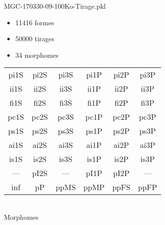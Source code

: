 MGC-170330-09-100Ko-Tirage.pkl
\begin{itemize}
\item 11416 formes
\item 50000 tirages
\item 34 morphomes
\end{itemize}
\begin{center}
\begin{tabular}{cccccc}
\hline
\cellcolor{white}pi1S & \cellcolor{orange}pi2S & \cellcolor{orange}pi3S & \cellcolor{white}pi1P & \cellcolor{white}pi2P & \cellcolor{white}pi3P\\
\cellcolor{brown}ii1S & \cellcolor{brown}ii2S & \cellcolor{brown}ii3S & \cellcolor{white}ii1P & \cellcolor{white}ii2P & \cellcolor{brown}ii3P\\
\cellcolor{yellow}fi1S & \cellcolor{lime}fi2S & \cellcolor{lime}fi3S & \cellcolor{green}fi1P & \cellcolor{white}fi2P & \cellcolor{green}fi3P\\
\cellcolor{yellow}pc1S & \cellcolor{yellow}pc2S & \cellcolor{yellow}pc3S & \cellcolor{white}pc1P & \cellcolor{white}pc2P & \cellcolor{yellow}pc3P\\
\cellcolor{teal}ps1S & \cellcolor{white}ps2S & \cellcolor{teal}ps3S & \cellcolor{white}ps1P & \cellcolor{white}ps2P & \cellcolor{teal}ps3P\\
\cellcolor{white}ai1S & \cellcolor{lightgray}ai2S & \cellcolor{lightgray}ai3S & \cellcolor{white}ai1P & \cellcolor{blue}ai2P & \cellcolor{white}ai3P\\
\cellcolor{black}is1S & \cellcolor{white}is2S & \cellcolor{lightgray}is3S & \cellcolor{white}is1P & \cellcolor{black}is2P & \cellcolor{white}is3P\\
--- & \cellcolor{white}pI2S & --- & \cellcolor{white}pI1P & \cellcolor{blue}pI2P & ---\\
\cellcolor{white}inf & \cellcolor{white}pP & \cellcolor{white}ppMS & \cellcolor{white}ppMP & \cellcolor{white}ppFS & \cellcolor{white}ppFP\\
\hline
\end{tabular}\\
Morphomes
\end{center}
\bigskip

